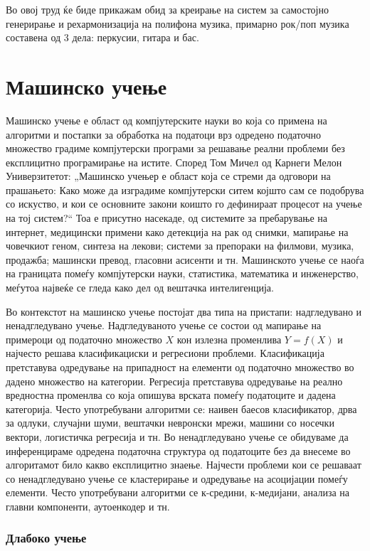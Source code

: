 Во овој труд ќе биде прикажам обид за креирање на систем за самостојно генерирање и рехармонизација на полифона музика, примарно рок/поп музика составена од 3 дела: перкусии, гитара и бас.

\chapter{Машинско учење}
\label{ch:masinsko}

Машинско учење е област од компјутерските науки во која со примена на алгоритми и постапки за обработка на податоци врз одредено податочно множество градиме компјутерски програми за решавање реални проблеми без експлицитно програмирање на истите. Според Том Мичел од Карнеги Мелон Универзитетот: „Машинско учењер е област која се стреми да одговори на прашањето: Како може да изградиме компјутерски ситем којшто сам се подобрува со искуство, и кои се основните закони коишто го дефинираат процесот на учење на тој систем?“ Тоа е присутно насекаде, од системите за пребарување на интернет, медицински примени како детекција на рак од снимки, мапирање на човечкиот геном, синтеза на лекови; системи за препораки на филмови, музика, продажба; машински превод, гласовни асисенти и тн. Машинското учење се наоѓа на границата помеѓу компјутерски науки, статистика, математика и инженерство, меѓутоа највеќе се гледа како дел од вештачка интелигенција.

Во контекстот на машинско учење постојат два типа на пристапи: надгледувано и ненадгледувано учење. Надгледуваното учење се состои од мапирање на примероци од податочно множество $X$ кон излезна променлива $Y=f(X)$ и најчесто решава класификациски и регресиони проблеми. Класификација претставува одредување на припадност на елементи од податочно множество во дадено множество на категории. Регресија претставува одредување на реално вредностна променлва со која опишува врската помеѓу податоците и дадена категорија. Често употребувани алгоритми се: наивен баесов класификатор, дрва за одлуки, случајни шуми, вештачки невронски мрежи, машини со носечки вектори, логистичка регресија и тн. 
Во ненадгледувано учење се обидуваме да инференцираме одредена податочна структура од податоците без да внесеме во алгоритамот било какво експлицитно знаење. Најчести проблеми кои се решаваат со ненадгледувано учење се кластерирање и одредување на асоцијации помеѓу елементи. Често употребувани алгоритми се к-средини, к-медијани, анализа на главни компоненти, аутоенкодер и тн.

\subsection{Длабоко учење}

